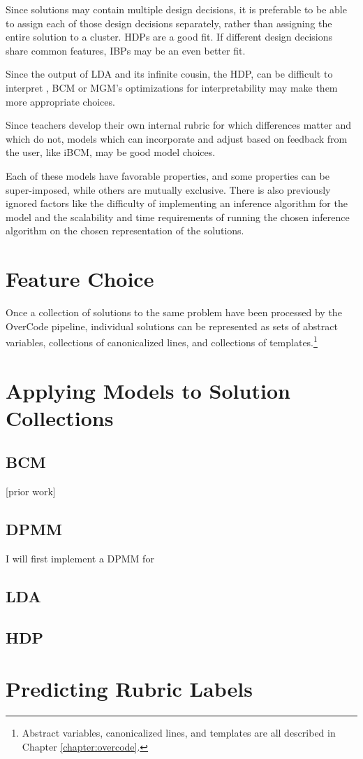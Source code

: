 Since solutions may contain multiple design decisions, it is preferable to be able to assign each of those design decisions separately, rather than assigning the entire solution to a cluster. HDPs are a good fit. If different design decisions share common features, IBPs may be an even better fit.

Since the output of LDA and its infinite cousin, the HDP, can be difficult to interpret \citet{ldainterpretation}, BCM or MGM's optimizations for interpretability may make them more appropriate choices.

Since teachers develop their own internal rubric for which differences matter and which do not, models which can incorporate and adjust based on feedback from the user, like iBCM, may be good model choices.

Each of these models have favorable properties, and some properties can be super-imposed, while others are mutually exclusive. There is also previously ignored factors like the difficulty of implementing an inference algorithm for the model and the scalability and time requirements of running the chosen inference algorithm on the chosen representation of the solutions.

\section{Feature Choice}

Once a collection of solutions to the same problem have been processed by the OverCode pipeline, individual solutions can be represented as sets of abstract variables, collections of canonicalized lines, and collections of templates.\footnote{Abstract variables, canonicalized lines, and templates are all described in Chapter \ref{chapter:overcode}.}

\section{Applying Models to Solution Collections}

\subsection{BCM}
[prior work]

\subsection{DPMM}

I will first implement a DPMM for 

\subsection{LDA}

\subsection{HDP}



\section{Predicting Rubric Labels}


